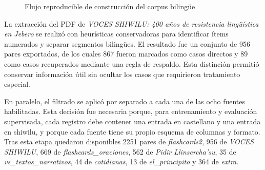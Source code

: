 \documentclass[12pt,a4paper,oneside]{book}
\begin{document}
\begin{figure}[htbp]
\centering
\caption{Flujo reproducible de construcción del corpus bilingüe}
\label{fig:pipeline-corpus}
\end{figure}

La extracción del PDF de \emph{VOCES SHIWILU: 400 años de resistencia lingüística en Jebero} se realizó con heurísticas conservadoras para identificar ítems numerados y separar segmentos bilingües. El resultado fue un conjunto de 956 pares exportados, de los cuales 867 fueron marcados como casos directos y 89 como casos recuperados mediante una regla de respaldo. Esta distinción permitió conservar información útil sin ocultar los casos que requirieron tratamiento especial.

En paralelo, el filtrado se aplicó por separado a cada una de las ocho fuentes habilitadas. Esta decisión fue necesaria porque, para entrenamiento y evaluación supervisada, cada registro debe contener una entrada en castellano y una entrada en shiwilu, y porque cada fuente tiene su propio esquema de columnas y formato. Tras esta etapa quedaron disponibles 2251 pares de \emph{flashcards2}, 956 de \emph{VOCES SHIWILU}, 669 de \emph{flashcards\_oraciones}, 562 de \emph{Pidir Llinsercha'su}, 35 de \emph{vs\_textos\_narrativos}, 44 de \emph{cotidianas}, 13 de \emph{el\_principito} y 364 de \emph{extra}.
\end{document}
